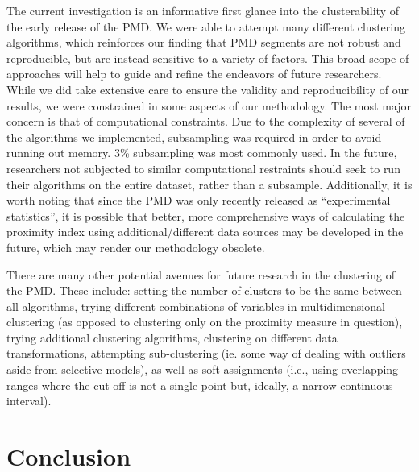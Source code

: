 \documentclass[11pt, a4paper]{article}
\begin{document}
The current investigation is an informative first glance into the clusterability of the early release of the PMD. We were able to attempt many different clustering algorithms, which reinforces our finding that PMD segments are not robust and reproducible, but are instead sensitive to a variety of factors. This broad scope of approaches will help to guide and refine the endeavors of future researchers. While we did take extensive care to ensure the validity and reproducibility of our results, we were constrained in some aspects of our methodology. The most major concern is that of computational constraints. Due to the complexity of several of the algorithms we implemented, subsampling was required in order to avoid running out memory. 3\% subsampling was most commonly used. In the future, researchers not subjected to similar computational restraints should seek to run their algorithms on the entire dataset, rather than a subsample. Additionally, it is worth noting that since the PMD was only recently released as ``experimental statistics'', it is possible that better,  more comprehensive ways of calculating the proximity index using additional/different data sources may be developed in the future, which may render our methodology obsolete.
\par
There are many other potential avenues for future research in the clustering of the PMD. These include: setting the number of clusters to be the same between all algorithms, trying different combinations of variables in multidimensional clustering (as opposed to clustering only on the proximity measure in question), trying additional clustering algorithms, clustering on different data transformations, attempting sub-clustering (ie. some way of dealing with outliers aside from selective models), as well as soft assignments (i.e., using overlapping ranges where the cut-off is not a single point but, ideally, a narrow continuous interval).








\pagebreak
\section{Conclusion}
\end{document}
